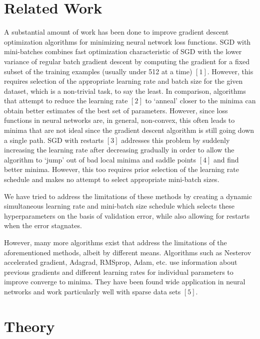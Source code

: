 \documentclass{article}
\begin{document}
\section{Related Work}
\par A substantial amount of work has been done to improve gradient descent optimization algorithms for minimizing neural network loss functions. SGD with mini-batches combines fast optimization characteristic of SGD with the lower variance of regular batch gradient descent by computing the gradient for a fixed subset of the training examples (usually under 512 at a time) $ [1] $. However, this requires selection of the appropriate learning rate and batch size for the given dataset, which is a non-trivial task, to say the least. In comparison, algorithms that attempt to reduce the learning rate $ [2] $ to `anneal' closer to the minima can obtain better estimates of the best set of parameters. However, since loss functions in neural networks are, in general, non-convex, this often leads to minima that are not ideal since the gradient descent algorithm is still going down a single path. SGD with restarts $ [3] $ addresses this problem by suddenly increasing the learning rate after decreasing gradually in order to allow the algorithm to `jump' out of bad local minima and saddle points $ [4] $ and find better minima. However, this too requires prior selection of the learning rate schedule and makes no attempt to select appropriate mini-batch sizes. 
\par We have tried to address the limitations of these methods by creating a dynamic simultaneous learning rate and mini-batch size schedule which selects these hyperparameters on the basis of validation error, while also allowing for restarts when the error stagnates. 
\par However, many more algorithms exist that address the limitations of the aforementioned methods, albeit by different means. Algorithms such as Nesterov accelerated gradient, Adagrad, RMSprop, Adam, etc. use information about previous gradients and different learning rates for individual parameters to improve converge to minima. They have been found wide application in neural networks and work particularly well with sparse data sets $ [5] $. 


\section{Theory} 
\end{document}
